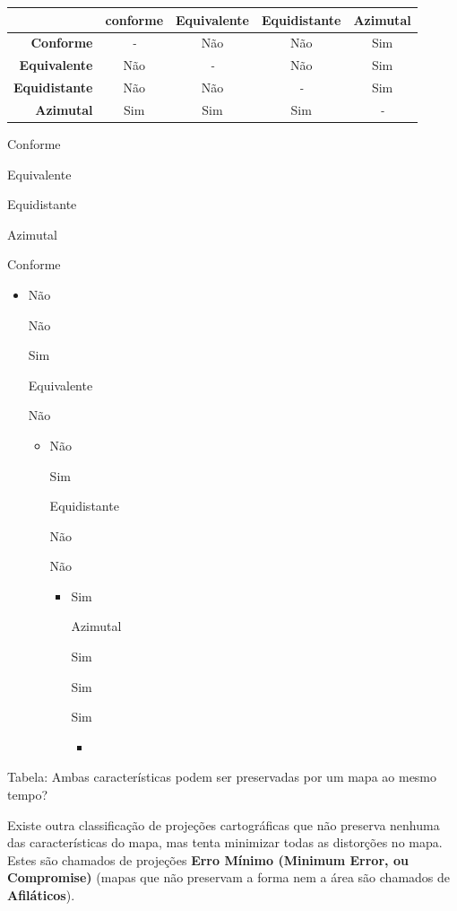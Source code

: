 \documentclass[
]{krantz}
\providecommand{\tightlist}{%
  \setlength{\itemsep}{0pt}\setlength{\parskip}{0pt}}
\begin{document}
\begin{longtable}[]{@{}rcccc@{}}
\toprule
& conforme & Equivalente & Equidistante & Azimutal \\
\midrule
\endhead
\textbf{Conforme} & \emph{-} & Não & Não & Sim \\
\textbf{Equivalente} & Não & \emph{-} & Não & Sim \\
\textbf{Equidistante} & Não & Não & \emph{-} & Sim \\
\textbf{Azimutal} & Sim & Sim & Sim & \emph{-} \\
\bottomrule
\end{longtable}

Conforme

Equivalente

Equidistante

Azimutal

Conforme

\begin{itemize}
\item
  Não

  Não

  Sim

  Equivalente

  Não

  \begin{itemize}
  \item
    Não

    Sim

    Equidistante

    Não

    Não

    \begin{itemize}
    \item
      Sim

      Azimutal

      Sim

      Sim

      Sim

      \begin{itemize}
      \tightlist
      \item
      \end{itemize}
    \end{itemize}
  \end{itemize}
\end{itemize}

Tabela: Ambas características podem ser preservadas por um mapa ao mesmo tempo?

Existe outra classificação de projeções cartográficas que não preserva nenhuma das características do mapa, mas tenta minimizar todas as distorções no mapa. Estes são chamados de projeções \textbf{Erro Mínimo (Minimum Error, ou Compromise)} (mapas que não preservam a forma nem a área são chamados de \textbf{Afiláticos}).
\end{document}
